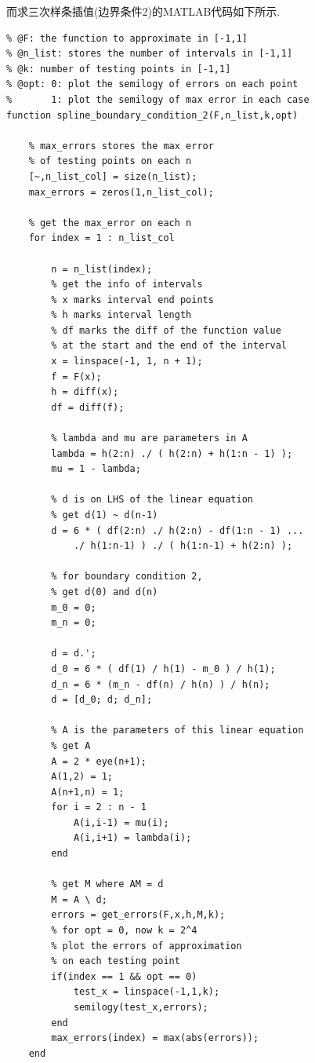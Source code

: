 \documentclass[12pt,a4paper,utf8]{ctexart}
\begin{document}
\begin{enumerate}
\begin{itemize}
    \par
    而求三次样条插值(边界条件2)的MATLAB代码如下所示.
    \begin{lstlisting}[frame=single]
% implementing spline with boundary condition 2
% @F: the function to approximate in [-1,1]
% @n_list: stores the number of intervals in [-1,1]
% @k: number of testing points in [-1,1]
% @opt: 0: plot the semilogy of errors on each point
%       1: plot the semilogy of max error in each case 
function spline_boundary_condition_2(F,n_list,k,opt)
    
    % max_errors stores the max error 
    % of testing points on each n
    [~,n_list_col] = size(n_list);
    max_errors = zeros(1,n_list_col);
    
    % get the max_error on each n
    for index = 1 : n_list_col
    
        n = n_list(index);
        % get the info of intervals
        % x marks interval end points
        % h marks interval length
        % df marks the diff of the function value 
        % at the start and the end of the interval
        x = linspace(-1, 1, n + 1);
        f = F(x);
        h = diff(x);
        df = diff(f);
    
        % lambda and mu are parameters in A
        lambda = h(2:n) ./ ( h(2:n) + h(1:n - 1) );
        mu = 1 - lambda;
    
        % d is on LHS of the linear equation
        % get d(1) ~ d(n-1)
        d = 6 * ( df(2:n) ./ h(2:n) - df(1:n - 1) ... 
            ./ h(1:n-1) ) ./ ( h(1:n-1) + h(2:n) );
    
        % for boundary condition 2,
        % get d(0) and d(n)
        m_0 = 0;
        m_n = 0;
    
        d = d.';
        d_0 = 6 * ( df(1) / h(1) - m_0 ) / h(1);
        d_n = 6 * (m_n - df(n) / h(n) ) / h(n);
        d = [d_0; d; d_n];
    
        % A is the parameters of this linear equation
        % get A
        A = 2 * eye(n+1);
        A(1,2) = 1;
        A(n+1,n) = 1;
        for i = 2 : n - 1
            A(i,i-1) = mu(i);
            A(i,i+1) = lambda(i);
        end
    
        % get M where AM = d
        M = A \ d;
        errors = get_errors(F,x,h,M,k);
        % for opt = 0, now k = 2^4
        % plot the errors of approximation 
        % on each testing point
        if(index == 1 && opt == 0)
            test_x = linspace(-1,1,k);
            semilogy(test_x,errors);
        end
        max_errors(index) = max(abs(errors));
    end
    

\end{lstlisting}
\end{itemize}
\end{enumerate}
\end{document}
